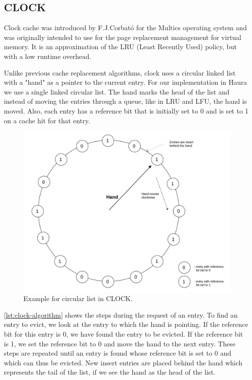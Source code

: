 \documentclass[
	12pt,
	a4paper,
	abstract,
	bibliography=totoc,
	chapterprefix,
	headings=openright,
	numbers=endperiod,
	parskip=half,
	twoside,
]{scrreprt}
\begin{document}
\subsection{CLOCK}

Clock cache was introduced by F.J.Corbató \cite{corbato1968paging} for the Multics operating system and was originally intended 
to use for the page replacement management for virtual memory.
It is an approximation of the LRU (Least Recently Used) policy, but with a low runtime overhead.

Unlike previous cache replacement algorithms, clock uses a circular linked list with a "hand" as a pointer to the current entry.
For our implementation in Haura we use a single linked circular list.
The hand marks the head of the list and instead of moving the entries through a queue, like in LRU and LFU, the hand is moved.
Also, each entry has a reference bit that is initially set to 0 and is set to 1 on a cache hit for that entry.

\begin{figure}[ht]
	\centering
	\includegraphics[scale=0.4]{clock.jpg}
	\caption{Example for circular list in CLOCK.}
		\label{fig:circular list for CLOCK}
\end{figure}

\cref{lst:clock-algorithm} shows the steps during the request of an entry.
To find an entry to evict, we look at the entry to which the hand is pointing.
If the reference bit for this entry is 0, we have found the entry to be evicted.
If the reference bit is 1, we set the reference bit to 0 and move the hand to the next entry.
These steps are repeated until an entry is found whose reference bit is set to 0 and which can thus be evicted.
New insert entries are placed behind the hand which represents the tail of the list, if we see the hand as the head of the list.
\end{document}
